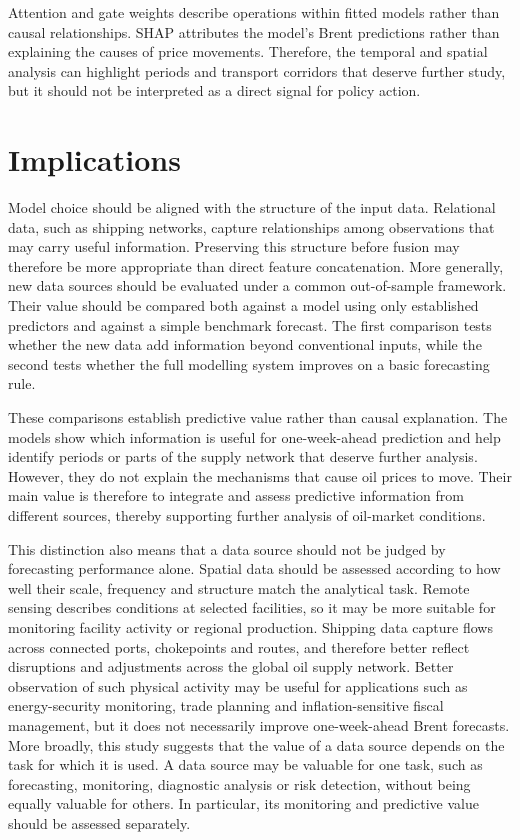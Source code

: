 \documentclass[
  british,
  12pt,
  oneside]{book}
\begin{document}
Attention and gate weights describe operations within fitted models rather than causal relationships. SHAP attributes the model's Brent predictions rather than explaining the causes of price movements. Therefore, the temporal and spatial analysis can highlight periods and transport corridors that deserve further study, but it should not be interpreted as a direct signal for policy action.

\section{Implications}\label{discussion-implications}

Model choice should be aligned with the structure of the input data. Relational data, such as shipping networks, capture relationships among observations that may carry useful information. Preserving this structure before fusion may therefore be more appropriate than direct feature concatenation. More generally, new data sources should be evaluated under a common out-of-sample framework. Their value should be compared both against a model using only established predictors and against a simple benchmark forecast. The first comparison tests whether the new data add information beyond conventional inputs, while the second tests whether the full modelling system improves on a basic forecasting rule.

These comparisons establish predictive value rather than causal explanation. The models show which information is useful for one-week-ahead prediction and help identify periods or parts of the supply network that deserve further analysis. However, they do not explain the mechanisms that cause oil prices to move. Their main value is therefore to integrate and assess predictive information from different sources, thereby supporting further analysis of oil-market conditions.

This distinction also means that a data source should not be judged by forecasting performance alone. Spatial data should be assessed according to how well their scale, frequency and structure match the analytical task. Remote sensing describes conditions at selected facilities, so it may be more suitable for monitoring facility activity or regional production. Shipping data capture flows across connected ports, chokepoints and routes, and therefore better reflect disruptions and adjustments across the global oil supply network. Better observation of such physical activity may be useful for applications such as energy-security monitoring, trade planning and inflation-sensitive fiscal management, but it does not necessarily improve one-week-ahead Brent forecasts. More broadly, this study suggests that the value of a data source depends on the task for which it is used. A data source may be valuable for one task, such as forecasting, monitoring, diagnostic analysis or risk detection, without being equally valuable for others. In particular, its monitoring and predictive value should be assessed separately.
\end{document}
